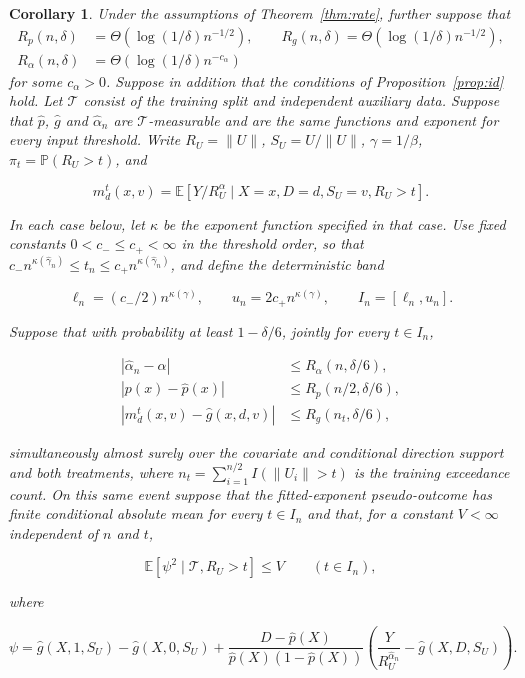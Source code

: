 \documentclass[12pt]{article}
\theoremstyle{plain}
\newtheorem{corollary}[theorem]{Corollary}
\theoremstyle{definition}
\begin{document}
\begin{corollary}\label{cor:rate}
Under the assumptions of Theorem~\ref{thm:rate}, further suppose that
\begin{align*}
R_p(n,\delta)&=\Theta(\log(1/\delta)n^{-1/2}),\qquad R_g(n,\delta)=\Theta(\log(1/\delta)n^{-1/2}),\\
R_\alpha(n,\delta)&=\Theta(\log(1/\delta)n^{-c_\alpha})
\end{align*}
for some $c_\alpha>0$. Suppose in addition that the conditions of Proposition~\ref{prop:id} hold. Let $\mathcal T$ consist of the training split and independent auxiliary data. Suppose that $\hat p$, $\hat g$ and $\hat\alpha_n$ are $\mathcal T$-measurable and are the same functions and exponent for every input threshold. Write $R_U=\|U\|$, $S_U=U/\|U\|$, $\gamma=1/\beta$, $\pi_t=\mathbb P(R_U>t)$, and

\[
m_d^t(x,v)=\mathbb E[Y/R_U^\alpha\mid X=x,D=d,S_U=v,R_U>t].
\]

In each case below, let $\kappa$ be the exponent function specified in that case. Use fixed constants $0<c_-\leq c_+<\infty$ in the threshold order, so that $c_-n^{\kappa(\hat\gamma_n)}\leq t_n\leq c_+n^{\kappa(\hat\gamma_n)}$, and define the deterministic band

\[
\ell_n=(c_-/2)n^{\kappa(\gamma)},\qquad u_n=2c_+n^{\kappa(\gamma)},\qquad I_n=[\ell_n,u_n].
\]

Suppose that with probability at least $1-\delta/6$, jointly for every $t\in I_n$,

\[
\begin{aligned}
|\hat\alpha_n-\alpha|&\leq R_\alpha(n,\delta/6),\\
|p(x)-\hat p(x)|&\leq R_p(n/2,\delta/6),\\
|m_d^t(x,v)-\hat g(x,d,v)|&\leq R_g(n_t,\delta/6),
\end{aligned}
\]

simultaneously almost surely over the covariate and conditional direction support and both treatments, where $n_t=\sum_{i=1}^{n/2}I(\|U_i\|>t)$ is the training exceedance count. On this same event suppose that the fitted-exponent pseudo-outcome has finite conditional absolute mean for every $t\in I_n$ and that, for a constant $V<\infty$ independent of $n$ and $t$,

\[
\mathbb E[\psi^2\mid\mathcal T,R_U>t]\leq V\qquad(t\in I_n),
\]

where

\[
\psi=\hat g(X,1,S_U)-\hat g(X,0,S_U)+\frac{D-\hat p(X)}{\hat p(X)(1-\hat p(X))}\left(\frac{Y}{R_U^{\hat\alpha_n}}-\hat g(X,D,S_U)\right).
\]


\end{corollary}
\end{document}
